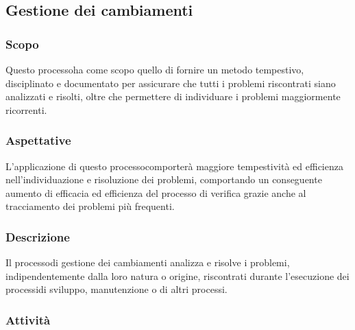 \subsection{Gestione dei cambiamenti}
\subsubsection{Scopo}
Questo processo\glosp ha come scopo quello di fornire un metodo tempestivo, disciplinato e documentato per assicurare che tutti i problemi riscontrati siano analizzati e risolti, oltre che permettere di individuare i problemi maggiormente ricorrenti.
\subsubsection{Aspettative}
L'applicazione di questo processo\glosp comporterà maggiore tempestività ed efficienza nell'individuazione e risoluzione dei problemi, comportando un conseguente aumento di efficacia ed efficienza del processo di verifica grazie anche al tracciamento dei problemi più frequenti.
\subsubsection{Descrizione} 
Il processo\glosp di gestione dei cambiamenti analizza e risolve i problemi, indipendentemente dalla loro natura o origine, riscontrati durante l'esecuzione dei processi\glosp di sviluppo, manutenzione o di altri processi\glosp. 
\subsubsection{Attività}
